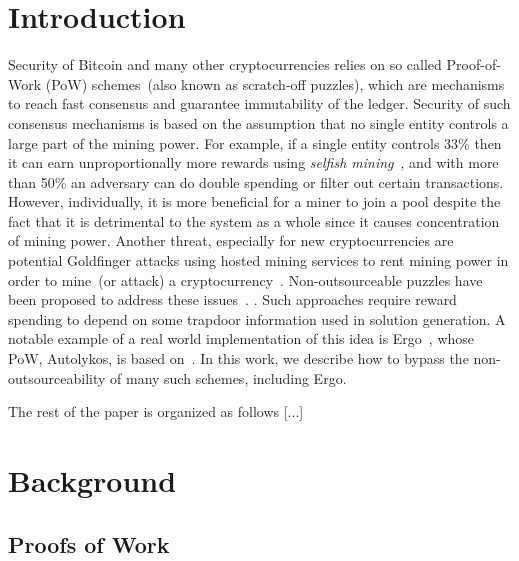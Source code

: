 \documentclass[11pt]{article}
\newcommand{\authnote}[2]{\marginpar{\parbox{\marginparwidth}{\tiny %
  \textsf{#1 {\textcolor{blue}{notes: #2}}}}}%
  \textcolor{blue}{\textbf{\dag}}}
\newcommand{\authnote}[2]{
  \textsf{#1 \textcolor{blue}{: #2}}}
\newcommand{\authnote}[2]{}
\newcommand{\knote}[1]{{\authnote{\textcolor{green}{kushti notes}}{#1}}}
\newcommand{\powname}{Autolykos\xspace}
\begin{document}
\section{Introduction}

Security of Bitcoin and many other cryptocurrencies relies on so called Proof-of-Work (PoW) schemes~(also known as scratch-off puzzles), which are mechanisms to reach fast consensus and guarantee immutability of the ledger. Security of such consensus mechanisms is based on the assumption that no single entity controls a large part of the mining power. For example, if a single entity controls
33\% then it can earn unproportionally more rewards using {\em selfish mining}~\cite{selfish}, and with more than 50\% an adversary can do double spending or filter out certain transactions. However,  individually, it is more beneficial for a miner to join a pool despite the fact that it is detrimental to the system as a whole since it causes concentration of mining power. Another threat, especially for new cryptocurrencies are potential Goldfinger attacks using hosted mining services to rent mining power in order to mine~(or attack) a cryptocurrency~\cite{goldfinger}. Non-outsourceable puzzles have been proposed to address these issues~\cite{miller2015nonoutsourceable,daian2017short}.\knote{links}. Such approaches require reward spending to depend on some trapdoor information used in solution generation. A notable example of a real world implementation of this idea is Ergo~\cite{ergo}, whose PoW, \powname, is based on~\cite{daian2017short}. In this work, we describe how to bypass the non-outsourceability of many such schemes, including Ergo. 

The rest of the paper is organized as follows [...]
\section{Background}

\subsection{Proofs of Work} 
\end{document}
